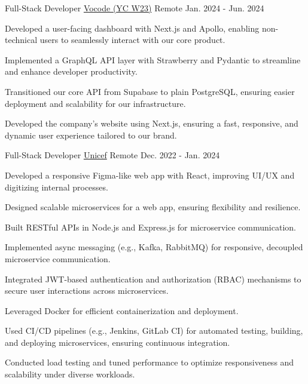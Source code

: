 \begin{cventries}
  \cventry
    {Full-Stack Developer} %
    {\href{https://vocode.dev}{Vocode (YC W23)}} %
    {Remote} %
    {Jan. 2024 - Jun. 2024} %
    {
      \begin{cvitems} %
        \item {Developed a user-facing dashboard with Next.js and Apollo, enabling non-technical users to seamlessly interact with our core product.}
        \item {Implemented a GraphQL API layer with Strawberry and Pydantic to streamline and enhance developer productivity.}
        \item {Transitioned our core API from Supabase to plain PostgreSQL, ensuring easier deployment and scalability for our infrastructure.}
        \item {Developed the company's website using Next.js, ensuring a fast, responsive, and dynamic user experience tailored to our brand.}
      \end{cvitems}
    }

  \cventry
    {Full-Stack Developer} %
    {\href{https://unicef.org}{Unicef}} %
    {Remote} %
    {Dec. 2022 - Jan. 2024} %
    {
      \begin{cvitems} %
        \item {Developed a responsive Figma-like web app with React, improving UI/UX and digitizing internal processes.}
        \item {Designed scalable microservices for a web app, ensuring flexibility and resilience.}
        \item {Built RESTful APIs in Node.js and Express.js for microservice communication.}
        \item {Implemented async messaging (e.g., Kafka, RabbitMQ) for responsive, decoupled microservice communication.}
        \item {Integrated JWT-based authentication and authorization (RBAC) mechanisms to secure user interactions across microservices.}
        \item {Leveraged Docker for efficient containerization and deployment.}
        \item {Used CI/CD pipelines (e.g., Jenkins, GitLab CI) for automated testing, building, and deploying microservices, ensuring continuous integration.}
        \item {Conducted load testing and tuned performance to optimize responsiveness and scalability under diverse workloads.}
      \end{cvitems}
    }


\end{cventries}
